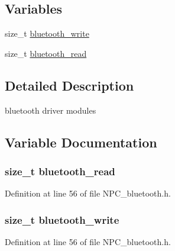 \subsection*{Variables}
\begin{DoxyCompactItemize}
\item 
size\+\_\+t \hyperlink{group__bluetooth_ga7143c37ba48173d0e245161e9ddc3592}{bluetooth\+\_\+write}
\item 
size\+\_\+t \hyperlink{group__bluetooth_ga723054cd6b30ca246f123b25e099146d}{bluetooth\+\_\+read}
\end{DoxyCompactItemize}


\subsection{Detailed Description}
bluetooth driver modules 



\subsection{Variable Documentation}
\subsubsection[{\texorpdfstring{bluetooth\+\_\+read}{bluetooth_read}}]{\setlength{\rightskip}{0pt plus 5cm}size\+\_\+t bluetooth\+\_\+read}\hypertarget{group__bluetooth_ga723054cd6b30ca246f123b25e099146d}{}\label{group__bluetooth_ga723054cd6b30ca246f123b25e099146d}


Definition at line 56 of file N\+P\+C\+\_\+bluetooth.\+h.

\subsubsection[{\texorpdfstring{bluetooth\+\_\+write}{bluetooth_write}}]{\setlength{\rightskip}{0pt plus 5cm}size\+\_\+t bluetooth\+\_\+write}\hypertarget{group__bluetooth_ga7143c37ba48173d0e245161e9ddc3592}{}\label{group__bluetooth_ga7143c37ba48173d0e245161e9ddc3592}


Definition at line 56 of file N\+P\+C\+\_\+bluetooth.\+h.

